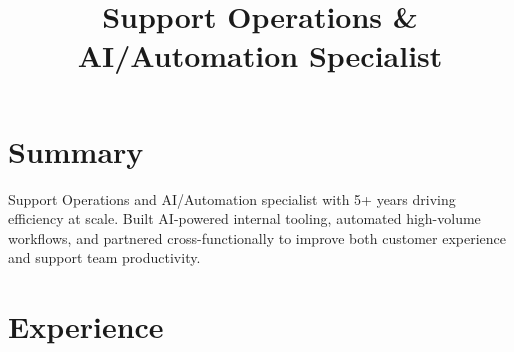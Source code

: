 \documentclass[11pt,letterpaper,sans]{moderncv}
\title{Support Operations \& AI/Automation Specialist}
\begin{document}
\makecvtitle

%
\section{Summary}
Support Operations and AI/Automation specialist with 5+ years driving efficiency
at scale. Built AI-powered internal tooling, automated high-volume workflows, and
partnered cross-functionally to improve both customer experience and support team
productivity.



\section{Experience}

\end{document}
